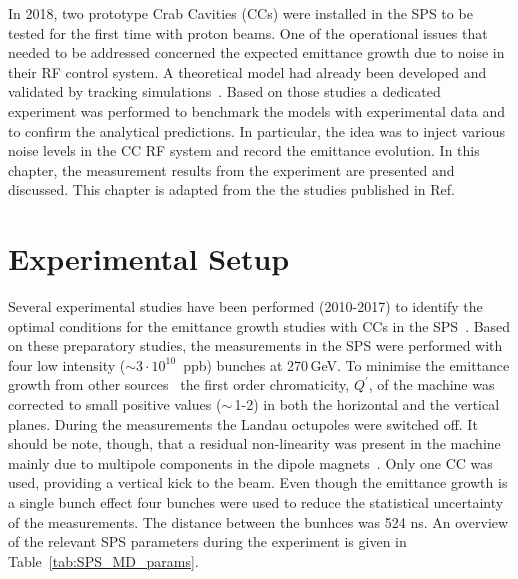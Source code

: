 In 2018, two prototype Crab Cavities (CCs) were installed in the SPS to be tested for the first time with proton beams. One of the operational issues that needed to be addressed concerned the expected emittance growth due to noise in their RF control system. A theoretical model had already been developed
and validated by tracking simulations~\cite{PhysRevSTAB.18.101001}. Based on those studies a dedicated experiment was performed to benchmark the models with experimental data and to confirm the analytical predictions. In particular, the idea was to inject various noise levels in the CC RF system and record
 the emittance evolution. In this chapter, the measurement results from the experiment are presented and discussed. This chapter is adapted from the the studies published in Ref.~\cite{Triantafyllou}

 \section{Experimental Setup} %

Several experimental studies have been performed (2010-2017) to identify the optimal conditions for the emittance growth studies with CCs in the SPS~\cite{Calaga:1451286, Antoniou:2649815}. Based on these preparatory studies, the measurements in the SPS were performed with four low intensity ($\sim 3 \cdot 10^{10}$\, ppb) bunches at 270\,GeV. To minimise the emittance growth from other sources~\cite{Antoniou:2649815} the first order chromaticity, $Q^\prime$, of the machine was corrected to small positive values ($\sim$\,1-2) in both the horizontal and the vertical planes. During the measurements the Landau octupoles were switched off. It should be note, though, that a residual non-linearity was present in the machine mainly due to multipole components in the dipole magnets~\cite{Carlà:2664976, Alekou:2640326}. Only one CC was used, providing a vertical kick to the beam. Even though the emittance growth is a single bunch effect four bunches were used to reduce the statistical uncertainty of the measurements. The distance between the bunhces was 524 ns. An overview of the relevant SPS parameters during the experiment is given in Table~\ref{tab:SPS_MD_params}. 


